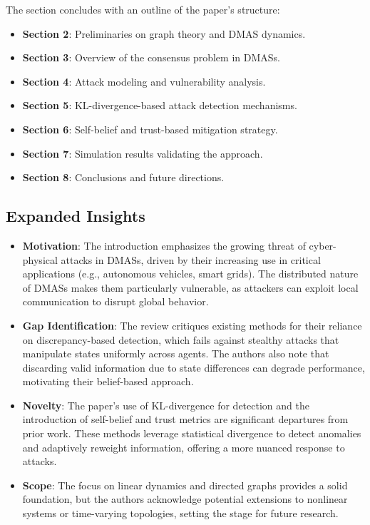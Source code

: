 \documentclass{article}
\begin{document}
The section concludes with an outline of the paper’s structure:
\begin{itemize}
    \item \textbf{Section 2}: Preliminaries on graph theory and DMAS dynamics.
    \item \textbf{Section 3}: Overview of the consensus problem in DMASs.
    \item \textbf{Section 4}: Attack modeling and vulnerability analysis.
    \item \textbf{Section 5}: KL-divergence-based attack detection mechanisms.
    \item \textbf{Section 6}: Self-belief and trust-based mitigation strategy.
    \item \textbf{Section 7}: Simulation results validating the approach.
    \item \textbf{Section 8}: Conclusions and future directions.
\end{itemize}

\subsection*{Expanded Insights}
\begin{itemize}
    \item \textbf{Motivation}: The introduction emphasizes the growing threat of cyber-physical attacks in DMASs, driven by their increasing use in critical applications (e.g., autonomous vehicles, smart grids). The distributed nature of DMASs makes them particularly vulnerable, as attackers can exploit local communication to disrupt global behavior.
    \item \textbf{Gap Identification}: The review critiques existing methods for their reliance on discrepancy-based detection, which fails against stealthy attacks that manipulate states uniformly across agents. The authors also note that discarding valid information due to state differences can degrade performance, motivating their belief-based approach.
    \item \textbf{Novelty}: The paper’s use of KL-divergence for detection and the introduction of self-belief and trust metrics are significant departures from prior work. These methods leverage statistical divergence to detect anomalies and adaptively reweight information, offering a more nuanced response to attacks.
    \item \textbf{Scope}: The focus on linear dynamics and directed graphs provides a solid foundation, but the authors acknowledge potential extensions to nonlinear systems or time-varying topologies, setting the stage for future research.
\end{itemize}
\end{document}
